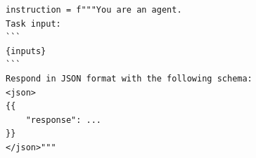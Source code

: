 \begin{lstlisting}
instruction = f"""You are an agent.
Task input:
```
{inputs}
```
Respond in JSON format with the following schema:
<json>
{{
    "response": ...
}}
</json>"""
\end{lstlisting}